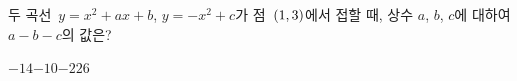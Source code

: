 두 곡선~$y=x^2+ax+b$, $y=-x^2+c$가 점~$(1{,}\mkern3mu\mathopen{}3)$에서 접할 때, 상수 $a$, $b$, $c$에 대하여 $a-b-c$의 값은?
\begin{choices32}{$-14$}{$-10$}{$-2$}{$2$}{$6$}\end{choices32}
